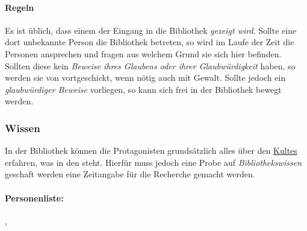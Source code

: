     \paragraph{Regeln}
        Es ist üblich, dass einem der Eingang in die Bibliothek \emph{gezeigt wird}. Sollte eine dort unbekannte Person die Bibliothek betreten, so wird im Laufe der Zeit  die Personen ansprechen und fragen aus welchem Grund sie sich hier befinden. Sollten diese kein \emph{Beweise ihres Glaubens oder ihrer Glaubwürdigkeit} haben, so werden sie von  vortgeschickt, wenn nötig auch mit Gewalt. Sollte jedoch ein \emph{glaubwürdiger Beweise} vorliegen, so kann sich frei in der Bibliothek bewegt werden.

    \subsubsection{Wissen}
        In der Bibliothek können die Protagonisten grundsätzlich alles über den \hyperref[sons:kult-von-colthubor]{Kultes} erfahren, was in den  steht. Hierfür muss jedoch eine Probe auf \emph{Bibliothekswissen} geschaft werden eine Zeitangabe für die Recherche gemacht werden.

    \paragraph{Personenliste:} , 
